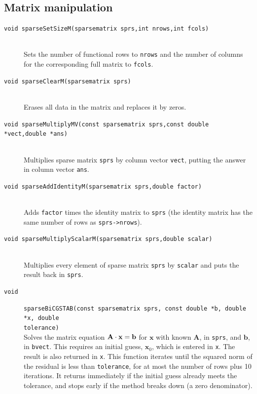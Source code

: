 \documentclass[11pt]{article}
\newcommand {\ttt} {\texttt}
\begin{document}
\subsection{Matrix manipulation}

\begin{description}

\item[\ttt{void sparseSetSizeM(sparsematrix sprs,int nrows,int fcols)}]
\hfill \\
Sets the number of functional rows to \ttt{nrows} and the number of columns for the corresponding full matrix to \ttt{fcols}.

\item[\ttt{void sparseClearM(sparsematrix sprs)}]
\hfill \\
Erases all data in the matrix and replaces it by zeros.


\item[\ttt{void sparseMultiplyMV(const sparsematrix sprs,const double *vect,double *ans)}]
\hfill \\
Multiplies sparse matrix \ttt{sprs} by column vector \ttt{vect}, putting the answer in column vector \ttt{ans}.

\item[\ttt{void sparseAddIdentityM(sparsematrix sprs,double factor)}]
\hfill \\
Adds \ttt{factor} times the identity matrix to \ttt{sprs} (the identity matrix has the same number of rows as \ttt{sprs->nrows}).

\item[\ttt{void sparseMultiplyScalarM(sparsematrix sprs,double scalar)}]
\hfill \\
Multiplies every element of sparse matrix \ttt{sprs} by \ttt{scalar} and puts the result back in \ttt{sprs}.

\item[\ttt{void}]
\ttt{sparseBiCGSTAB(const sparsematrix sprs, const double *b, double *x, double \\ tolerance)}
\hfill \\
Solves the matrix equation $\bf{A}\cdot \bm{x} = \bm{b}$ for $\bm{x}$ with known $\bm{A}$, in \ttt{sprs}, and $\bm{b}$, in \ttt{bvect}. This requires an initial guess, $\bm{x}_0$, which is entered in \ttt{x}. The result is also returned in \ttt{x}. This function iterates until the squared norm of the residual is less than \ttt{tolerance}, for at most the number of rows plus 10 iterations. It returns immediately if the initial guess already meets the tolerance, and stops early if the method breaks down (a zero denominator).


\end{description}
\end{document}
